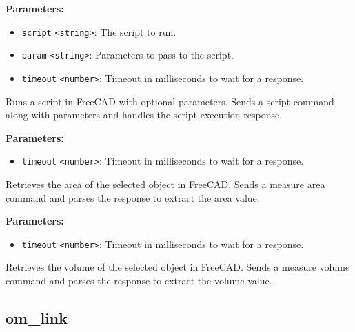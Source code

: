 \documentclass[12pt,a4paper]{article}
\begin{document}
\noindent \textbf{Parameters:}
\begin{itemize}
  \item \texttt{script} \texttt{<string>}: The script to run.
  \item \texttt{param} \texttt{<string>}: Parameters to pass to the script.
  \item \texttt{timeout} \texttt{<number>}: Timeout in milliseconds to wait for a response.
\end{itemize}

\noindent Runs a script in FreeCAD with optional parameters.
Sends a script command along with parameters and handles the script execution response.

\vspace{5mm}
\noindent {}


\noindent \textbf{Parameters:}
\begin{itemize}
  \item \texttt{timeout} \texttt{<number>}: Timeout in milliseconds to wait for a response.
\end{itemize}

\noindent Retrieves the area of the selected object in FreeCAD.
Sends a measure area command and parses the response to extract the area value.

\vspace{5mm}
\noindent {}


\noindent \textbf{Parameters:}
\begin{itemize}
  \item \texttt{timeout} \texttt{<number>}: Timeout in milliseconds to wait for a response.
\end{itemize}

\noindent Retrieves the volume of the selected object in FreeCAD.
Sends a measure volume command and parses the response to extract the volume value.


\subsection{om\_link}
\vspace{5mm}
\noindent {}
\end{document}
